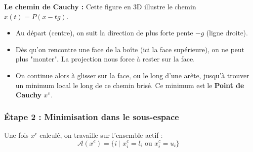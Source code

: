 \begin{center}
\end{center}

\begin{figureexplanation}
\textbf{Le chemin de Cauchy :}
Cette figure en 3D illustre le chemin $x(t) = P(x - tg)$.
\begin{itemize}
    \item Au départ (centre), on suit la direction de plus forte pente $-g$ (ligne droite).
    \item Dès qu'on rencontre une face de la boîte (ici la face supérieure), on ne peut plus "monter". La projection nous force à rester sur la face.
    \item On continue alors à glisser sur la face, ou le long d'une arête, jusqu'à trouver un minimum local le long de ce chemin brisé. Ce minimum est le \textbf{Point de Cauchy} $x^c$.
\end{itemize}
\end{figureexplanation}

\subsubsection{Étape 2 : Minimisation dans le sous-espace}

Une fois $x^c$ calculé, on travaille sur l'ensemble actif :
\begin{equation}
    \mathcal{A}(x^c) = \{ i \mid x_i^c = l_i \text{ ou } x_i^c = u_i \}
\end{equation}

